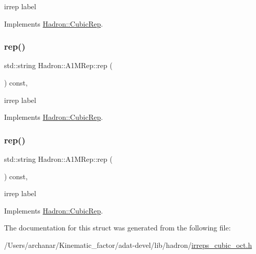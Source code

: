 irrep label 

Implements \mbox{\hyperlink{structHadron_1_1CubicRep_ac3eb63608803d44c68681f158e14eb1b}{Hadron\+::\+Cubic\+Rep}}.

\mbox{\label{structHadron_1_1A1MRep_ace32cdcf9819db0556ec88464d828e6f}} 
\subsubsection{\texorpdfstring{rep()}{rep()}\hspace{0.1cm}{\footnotesize\ttfamily [2/3]}}
{\footnotesize\ttfamily std\+::string Hadron\+::\+A1\+M\+Rep\+::rep (\begin{DoxyParamCaption}{ }\end{DoxyParamCaption}) const\hspace{0.3cm}{\ttfamily [inline]}, {\ttfamily [virtual]}}

irrep label 

Implements \mbox{\hyperlink{structHadron_1_1CubicRep_ac3eb63608803d44c68681f158e14eb1b}{Hadron\+::\+Cubic\+Rep}}.

\mbox{\label{structHadron_1_1A1MRep_ace32cdcf9819db0556ec88464d828e6f}} 
\subsubsection{\texorpdfstring{rep()}{rep()}\hspace{0.1cm}{\footnotesize\ttfamily [3/3]}}
{\footnotesize\ttfamily std\+::string Hadron\+::\+A1\+M\+Rep\+::rep (\begin{DoxyParamCaption}{ }\end{DoxyParamCaption}) const\hspace{0.3cm}{\ttfamily [inline]}, {\ttfamily [virtual]}}

irrep label 

Implements \mbox{\hyperlink{structHadron_1_1CubicRep_ac3eb63608803d44c68681f158e14eb1b}{Hadron\+::\+Cubic\+Rep}}.



The documentation for this struct was generated from the following file\+:\begin{DoxyCompactItemize}
\item 
/\+Users/archanar/\+Kinematic\+\_\+factor/adat-\/devel/lib/hadron/\mbox{\hyperlink{adat-devel_2lib_2hadron_2irreps__cubic__oct_8h}{irreps\+\_\+cubic\+\_\+oct.\+h}}\end{DoxyCompactItemize}
